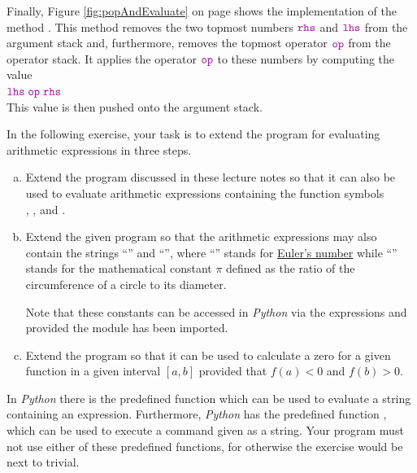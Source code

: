 Finally, Figure \ref{fig:popAndEvaluate} on page \pageref{fig:popAndEvaluate} shows the implementation of the
method .
This method removes the two topmost numbers $\mytt{rhs}$ and $\mytt{lhs}$ from the argument stack and,
furthermore, removes the topmost operator $\mytt{op}$ from the operator stack.  It applies the operator
$\mytt{op}$ to these numbers 
by computing the value 
\\[0.2cm]
\hspace*{1.3cm}
$ \mytt{lhs} \;\mytt{op}\; \mytt{rhs} $
\\[0.2cm]
This value is then pushed onto the argument stack.

\exercise
In the following exercise, your task is to extend the program for evaluating arithmetic expressions in three steps.
\begin{enumerate}[(a)]
\item Extend the program discussed in these lecture notes so that it can also be used to evaluate
      arithmetic expressions containing the function symbols
      \\[0.2cm]
      \hspace*{1.3cm}
      , , and .
\item Extend the given program so that the arithmetic expressions may also contain 
      the strings ``'' and ``'', where ``'' stands for 
      \href{http://en.wikipedia.org/wiki/E_(mathematical_constant)}{Euler's number} 
      while ``'' stands for the mathematical constant
      \href{http://en.wikipedia.org/wiki/Pi}{$\pi$} defined as the ratio of the circumference of a
      circle to its diameter. 

      Note that these constants can be accessed in \textsl{Python} via the expressions 
      and  provided the module  has been imported.
\item Extend the program so that it can be used to calculate a zero for a given function in a given
      interval $[a,b]$ provided that $f(a) < 0$ and $f(b) > 0$.  
\end{enumerate}
In \textsl{Python} there is the predefined function  which can be used to evaluate a string
containing an expression.  Furthermore, \textsl{Python} has the predefined function , which can be
used to execute a command given as a string.  Your program must not use either of these predefined functions,
for otherwise the exercise would be next to trivial.
\eox

